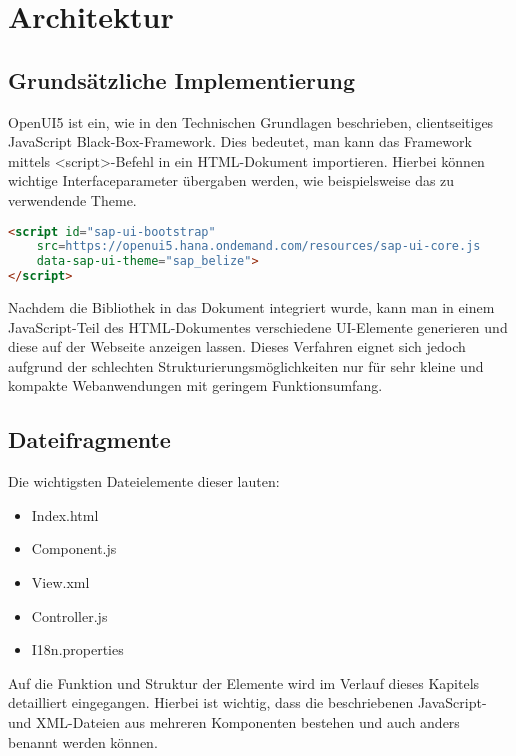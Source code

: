 \section{Architektur}

\subsection{Grundsätzliche Implementierung}

OpenUI5 ist ein, wie in den Technischen Grundlagen beschrieben, clientseitiges JavaScript Black-Box-Framework. Dies bedeutet, man kann das Framework mittels <script>-Befehl in ein HTML-Dokument importieren. Hierbei können wichtige Interfaceparameter übergaben werden, wie beispielsweise das zu verwendende Theme.

\begin{lstlisting}[caption=Beispiel für das Einbinden von OpenUI5, label=lst:UI5Einbinden, language=HTML]
<script id="sap-ui-bootstrap"
	src=https://openui5.hana.ondemand.com/resources/sap-ui-core.js
	data-sap-ui-theme="sap_belize">
</script>
\end{lstlisting}

Nachdem die Bibliothek in das Dokument integriert wurde, kann man in einem JavaScript-Teil des HTML-Dokumentes verschiedene UI-Elemente generieren und diese auf der Webseite anzeigen lassen. Dieses Verfahren eignet sich jedoch aufgrund der schlechten Strukturierungsmöglichkeiten nur für sehr kleine und kompakte Webanwendungen mit geringem Funktionsumfang. 

\subsection{Dateifragmente}

Die wichtigsten Dateielemente dieser lauten:

\begin{itemize}
	\item Index.html
	\item Component.js
	\item View.xml
	\item Controller.js
	\item I18n.properties
\end{itemize}

Auf die Funktion und Struktur der Elemente wird im Verlauf dieses Kapitels detailliert eingegangen. Hierbei ist wichtig, dass die beschriebenen JavaScript- und XML-Dateien aus mehreren Komponenten bestehen und auch anders benannt werden können. 

